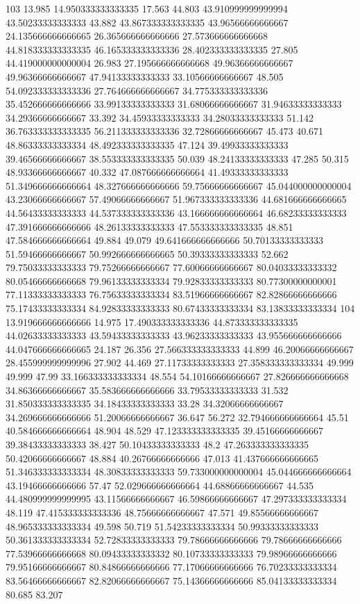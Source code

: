 103 13.985 14.950333333333335 17.563 44.803 43.910999999999994 43.50233333333333 43.882 43.867333333333335 43.96566666666667 24.135666666666665 26.365666666666666 27.573666666666668 44.818333333333335 46.165333333333336 28.402333333333335 27.805 44.419000000000004 26.983 27.195666666666668 49.96366666666667 49.96366666666667 47.94133333333333 33.10566666666667 48.505 54.092333333333336 27.764666666666667 34.775333333333336 35.452666666666666 33.99133333333333 31.68066666666667 31.94633333333333 34.29366666666667 33.392 34.45933333333333 34.28033333333333 51.142 36.763333333333335 56.211333333333336 32.72866666666667 45.473 40.671 48.86333333333334 48.492333333333335 47.124 39.49933333333333 39.46566666666667 38.553333333333335 50.039 48.24133333333333 47.285 50.315 48.93366666666667 40.332 47.087666666666664 41.49333333333333 51.349666666666664 48.327666666666666 59.75666666666667 45.044000000000004 43.23066666666667 57.49066666666667 51.967333333333336 44.681666666666665 44.56433333333333 44.537333333333336 43.166666666666664 46.68233333333333 47.391666666666666 48.26133333333333 47.553333333333335 48.851 47.584666666666664 49.884 49.079 49.641666666666666 50.70133333333333 51.59466666666667 50.992666666666665 50.39333333333333 52.662 79.75033333333333 79.75266666666667 77.60066666666667 80.04033333333332 80.05466666666668 79.96133333333334 79.92833333333333 80.77300000000001 77.11333333333333 76.75633333333334 83.51966666666667 82.82866666666666 75.17433333333334 84.92833333333333 80.67433333333334 83.13833333333334
104 13.919666666666666 14.975 17.490333333333336 44.873333333333335 44.02633333333333 43.59433333333333 43.96233333333333 43.955666666666666 44.047666666666665 24.187 26.356 27.566333333333333 44.899 46.20066666666667 28.455999999999996 27.902 44.469 27.11733333333333 27.358333333333334 49.999 49.999 47.99 33.166333333333334 48.554 54.10166666666667 27.826666666666668 34.86366666666667 35.583666666666666 33.79533333333333 31.532 31.850333333333335 34.18433333333333 33.28 34.32066666666667 34.269666666666666 51.20066666666667 36.647 56.272 32.794666666666664 45.51 40.584666666666664 48.904 48.529 47.123333333333335 39.45166666666667 39.38433333333333 38.427 50.10433333333333 48.2 47.263333333333335 50.42066666666667 48.884 40.26766666666666 47.013 41.437666666666665 51.346333333333334 48.30833333333333 59.733000000000004 45.044666666666664 43.19466666666666 57.47 52.029666666666664 44.68866666666667 44.535 44.480999999999995 43.11566666666667 46.59866666666667 47.297333333333334 48.119 47.415333333333336 48.75666666666667 47.571 49.85566666666667 48.965333333333334 49.598 50.719 51.54233333333334 50.99333333333333 50.361333333333334 52.72833333333333 79.78666666666666 79.78666666666666 77.53966666666668 80.09433333333332 80.10733333333333 79.98966666666666 79.95166666666667 80.84866666666666 77.17066666666666 76.70233333333334 83.56466666666667 82.82066666666667 75.14366666666666 85.04133333333334 80.685 83.207
